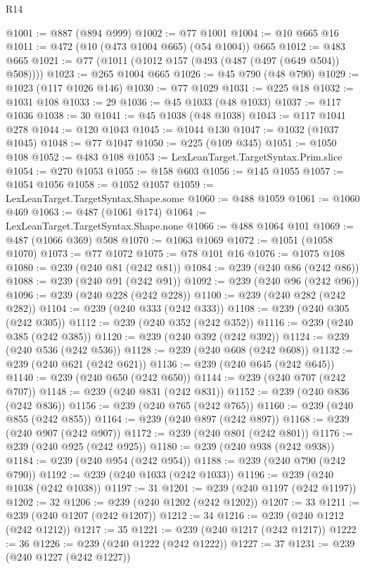 \begin{lexlean}{R14}
\begin{coremodule}
@1001 := @887 (@894 @999)
@1002 := @77 @1001
@1004 := @10 @665 @16
@1011 := @472 (@10 (@473 @1004 @665) (@54 @1004)) @665
@1012 := @483 @665
@1021 := @77 (@1011 (@1012 @157 (@493 (@487 (@497 (@649 @504)) @508))))
@1023 := @265 @1004 @665
@1026 := @45 @790 (@48 @790)
@1029 := @1023 (@117 @1026 @146)
@1030 := @77 @1029
@1031 := @225 @18
@1032 := @1031 @108
@1033 := 29
@1036 := @45 @1033 (@48 @1033)
@1037 := @117 @1036
@1038 := 30
@1041 := @45 @1038 (@48 @1038)
@1043 := @117 @1041 @278
@1044 := @120 @1043
@1045 := @1044 @130
@1047 := @1032 (@1037 @1045)
@1048 := @77 @1047
@1050 := @225 (@109 @345)
@1051 := @1050 @108
@1052 := @483 @108
@1053 := LexLeanTarget.TargetSyntax.Prim.slice
@1054 := @270 @1053
@1055 := @158 @603
@1056 := @145 @1055
@1057 := @1054 @1056
@1058 := @1052 @1057
@1059 := LexLeanTarget.TargetSyntax.Shape.some
@1060 := @488 @1059
@1061 := @1060 @469
@1063 := @487 (@1061 @174)
@1064 := LexLeanTarget.TargetSyntax.Shape.none
@1066 := @488 @1064 @101
@1069 := @487 (@1066 @369) @508
@1070 := @1063 @1069
@1072 := @1051 (@1058 @1070)
@1073 := @77 @1072
@1075 := @78 @101 @16
@1076 := @1075 @108
@1080 := @239 (@240 @81 (@242 @81))
@1084 := @239 (@240 @86 (@242 @86))
@1088 := @239 (@240 @91 (@242 @91))
@1092 := @239 (@240 @96 (@242 @96))
@1096 := @239 (@240 @228 (@242 @228))
@1100 := @239 (@240 @282 (@242 @282))
@1104 := @239 (@240 @333 (@242 @333))
@1108 := @239 (@240 @305 (@242 @305))
@1112 := @239 (@240 @352 (@242 @352))
@1116 := @239 (@240 @385 (@242 @385))
@1120 := @239 (@240 @392 (@242 @392))
@1124 := @239 (@240 @536 (@242 @536))
@1128 := @239 (@240 @608 (@242 @608))
@1132 := @239 (@240 @621 (@242 @621))
@1136 := @239 (@240 @645 (@242 @645))
@1140 := @239 (@240 @650 (@242 @650))
@1144 := @239 (@240 @707 (@242 @707))
@1148 := @239 (@240 @831 (@242 @831))
@1152 := @239 (@240 @836 (@242 @836))
@1156 := @239 (@240 @765 (@242 @765))
@1160 := @239 (@240 @855 (@242 @855))
@1164 := @239 (@240 @897 (@242 @897))
@1168 := @239 (@240 @907 (@242 @907))
@1172 := @239 (@240 @801 (@242 @801))
@1176 := @239 (@240 @925 (@242 @925))
@1180 := @239 (@240 @938 (@242 @938))
@1184 := @239 (@240 @954 (@242 @954))
@1188 := @239 (@240 @790 (@242 @790))
@1192 := @239 (@240 @1033 (@242 @1033))
@1196 := @239 (@240 @1038 (@242 @1038))
@1197 := 31
@1201 := @239 (@240 @1197 (@242 @1197))
@1202 := 32
@1206 := @239 (@240 @1202 (@242 @1202))
@1207 := 33
@1211 := @239 (@240 @1207 (@242 @1207))
@1212 := 34
@1216 := @239 (@240 @1212 (@242 @1212))
@1217 := 35
@1221 := @239 (@240 @1217 (@242 @1217))
@1222 := 36
@1226 := @239 (@240 @1222 (@242 @1222))
@1227 := 37
@1231 := @239 (@240 @1227 (@242 @1227))

\end{coremodule}
\end{lexlean}
